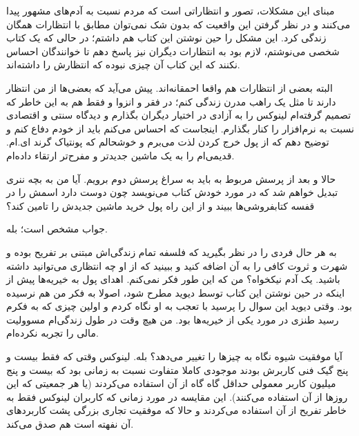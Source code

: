 مبنای این مشکلات، تصور و انتظاراتی است که مردم نسبت به آدم‌های مشهور
پیدا می‌کنند و در نظر گرفتن این واقعیت که بدون شک نمی‌توان مطابق با
انتظارات همگان زندگی کرد. این مشکل را حین نوشتن این کتاب هم داشتم؛ در
حالی که یک کتاب شخصی می‌نوشتم، لازم بود به انتظارات دیگران نیز پاسخ دهم
تا خوانندگان احساس نکنند که این کتاب آن چیزی نبوده که انتظارش را
داشته‌اند.

البته بعضی از انتظارات هم واقعا احمقانه‌اند. پیش می‌آید که بعضی‌ها از من
انتظار دارند تا مثل یک راهب مدرن زندگی کنم؛ در فقر و انزوا و فقط هم به
این خاطر که تصمیم گرفته‌ام لینوکس را به آزادی در اختیار دیگران بگذارم و
دیدگاه سنتی و اقتصادی نسبت به نرم‌افزار را کنار بگذارم. اینجاست که
احساس می‌کنم باید از خودم دفاع کنم و توضیح دهم که از پول خرج کردن لذت
می‌برم و خوشحالم که پونتیاک گرند ای.ام. قدیمی‌ام را به یک ماشین جدیدتر و
مفرح‌تر ارتقاء داده‌ام.

حالا و بعد از پرسش مربوط به  باید به سراغ پرسش
دوم برویم. 
آیا من به بچه ننری تبدیل خواهم شد که در مورد خودش کتاب می‌نویسد چون
دوست دارد اسمش را در قفسه کتابفروشی‌ها ببیند و از این راه پول خرید
ماشین جدیدش را تامین کند؟

جواب مشخص است؛ بله.

به هر حال فردی را در نظر بگیرید که فلسفه تمام زندگی‌اش مبتنی بر تفریح
بوده و شهرت و ثروت کافی را به آن اضافه کنید و ببینید که از او چه
انتظاری می‌توانید داشته باشید. یک آدم نیکخواه؟ من که این طور فکر
نمی‌کنم. اهدای پول به خیریه‌ها پیش از اینکه در حین نوشتن این کتاب توسط
دیوید مطرح شود، اصولا به فکر من هم نرسیده بود. وقتی دیوید این سوال را
پرسید با تعجب به او نگاه کردم و اولین چیزی که به فکرم رسید طنزی در
مورد یکی از خیریه‌ها بود. من هیچ وقت در طول زندگی‌ام مسوولیت مالی را
تجربه نکرده‌ام.

آیا موفقیت شیوه نگاه به چیزها را تغییر می‌دهد؟ بله. لینوکس وقتی که فقط
بیست و پنج گیک فنی کاربرش بودند موجودی کاملا متفاوت نسبت به زمانی بود
که بیست و پنج میلیون کاربر معمولی حداقل گاه گاه از آن استفاده می‌کردند
(یا هر جمعیتی که این روزها از آن استفاده می‌کنند). این مقایسه در مورد
زمانی که کاربران لینوکس فقط به خاطر تفریح از آن استفاده می‌کردند و حالا
که موفقیت تجاری بزرگی پشت کاربردهای آن نفهته است هم صدق می‌کند.

